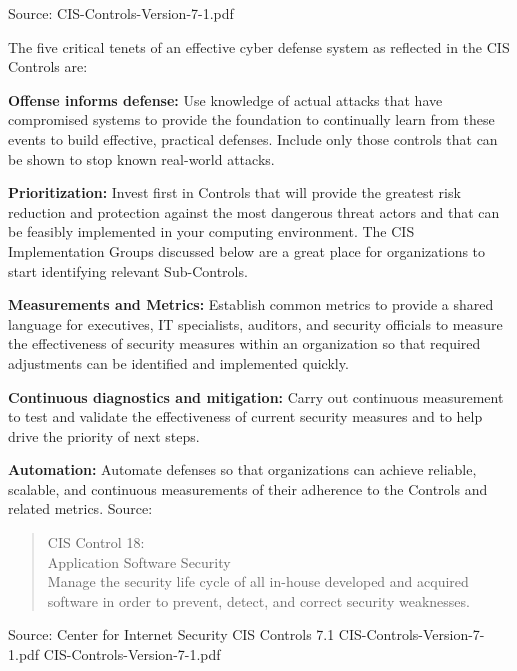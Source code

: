 \documentclass[Screen16to9,17pt]{foils}
\begin{document}
Source:  CIS-Controls-Version-7-1.pdf


\begin{list2}
\item
The five critical tenets of an effective cyber defense system as reflected
in the CIS Controls are:
\item {\bf Offense informs defense:} Use knowledge of actual attacks that have
compromised systems to provide the foundation to continually learn
from these events to build effective, practical defenses. Include only
those controls that can be shown to stop known real-world attacks.
\item {\bf Prioritization:} Invest first in Controls that will provide the greatest risk
reduction and protection against the most dangerous threat actors
and that can be feasibly implemented in your computing environment.
The CIS Implementation Groups discussed below are a great place for
organizations to start identifying relevant Sub-Controls.
\item {\bf Measurements and Metrics:} Establish common metrics to provide a
shared language for executives, IT specialists, auditors, and security
officials to measure the effectiveness of security measures within
an organization so that required adjustments can be identified and
implemented quickly.
\item {\bf Continuous diagnostics and mitigation:} Carry out continuous
measurement to test and validate the effectiveness of current security
measures and to help drive the priority of next steps.
\item {\bf Automation:} Automate defenses so that organizations can achieve
reliable, scalable, and continuous measurements of their adherence to
the Controls and related metrics. \hskip 2cm Source:

\begin{quote}
CIS Control 18:\\
Application Software Security\\
Manage the security life cycle of all in-house developed and acquired software in order to prevent, detect, and correct security weaknesses.
\end{quote}

\begin{list1}
\item
\item
\item
\item
\end{list1}

Source: Center for Internet Security CIS Controls 7.1 CIS-Controls-Version-7-1.pdf
 CIS-Controls-Version-7-1.pdf
\end{list2}
\end{document}
